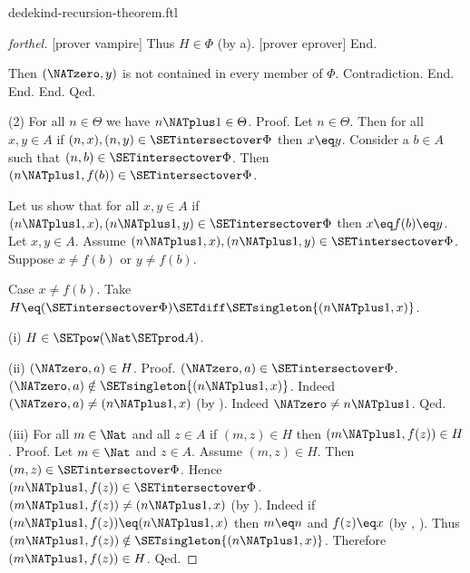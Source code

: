 \documentclass{naproche-library}
\begin{document}
\begin{smodule}[title=Dedekind's Recursion Theorem]{dedekind-recursion-theorem.ftl}
\begin{proof}[forthel]
              [prover vampire]
              Thus $H \in \Phi$ (by a).
              [prover eprover]
            End.

            Then $(\NATzero,y)$ is not contained in every member of $\Phi$.
            Contradiction.
          End.
        End.
      End.
    Qed.

    (2) For all $n \in \Theta$ we have $n \NATplus 1 \in \Theta$. \newline
    Proof.
      Let $n \in \Theta$.
      Then for all $x, y \in A$ if $(n, x), (n, y) \in \SETintersectover \Phi$ then
      $x \eq y$.
      Consider a $b \in A$ such that $(n,b) \in \SETintersectover \Phi$.
      Then $(n \NATplus 1, f(b)) \in \SETintersectover \Phi$.

      Let us show that for all $x, y \in A$ if $(n \NATplus 1, x),
      (n \NATplus 1, y) \in \SETintersectover \Phi$ then $x \eq f(b) \eq y$.
        Let $x, y \in A$.
        Assume $(n \NATplus 1, x), (n \NATplus 1, y) \in \SETintersectover \Phi$.
        Suppose $x \neq f(b)$ or $y \neq f(b)$.

        Case $x \neq f(b)$.
          Take $H \eq (\SETintersectover \Phi) \SETdiff \SETsingleton{(n \NATplus 1,x)}$.

          (i) $H \in \SETpow(\Nat \SETprod A)$.

          (ii) $(\NATzero,a) \in H$. \newline
          Proof.
            $(\NATzero,a) \in \SETintersectover \Phi$.
            $(\NATzero,a) \notin \SETsingleton{(n \NATplus 1,x)}$.
            Indeed $(\NATzero,a) \neq (n \NATplus 1,x)$ (by ).
            Indeed $\NATzero \neq n \NATplus 1$.
          Qed.

          (iii) For all $m \in \Nat$ and all $z \in A$ if $(m,z) \in H$ then $(m \NATplus 1,f(z)) \in H$. \newline
          Proof.
            Let $m \in \Nat$ and $z \in A$.
            Assume $(m,z) \in H$.
            Then $(m,z) \in \SETintersectover \Phi$.
            Hence $(m \NATplus 1,f(z)) \in \SETintersectover \Phi$.
            $(m \NATplus 1,f(z)) \neq (n \NATplus 1,x)$ (by ).
            Indeed if $(m \NATplus 1,f(z)) \eq (n \NATplus 1,x)$ then $m \eq n$ and $f(z) \eq x$ (by , ).
            Thus $(m \NATplus 1,f(z)) \notin \SETsingleton{(n \NATplus 1,x)}$.
            Therefore $(m \NATplus 1,f(z)) \in H$.
          Qed.


\end{proof}
\end{smodule}
\end{document}
